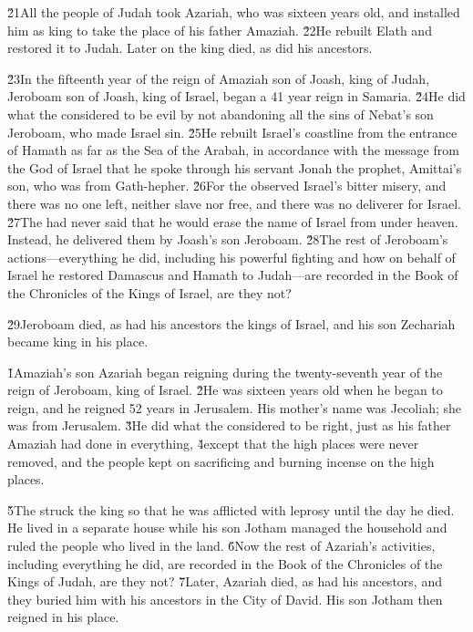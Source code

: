 \v{21}All the people of Judah took Azariah, who was sixteen years old, and installed him as king to take the place of his father Amaziah. \v{22}He rebuilt Elath and restored it to Judah. Later on the king died, as did his ancestors.

\v{23}In the fifteenth year of the reign of Amaziah son of Joash, king of Judah, Jeroboam son of Joash, king of Israel, began a 41 year reign in Samaria. \v{24}He did what the  considered to be evil by not abandoning all the sins of Nebat's son Jeroboam, who made Israel sin. \v{25}He rebuilt Israel's coastline from the entrance of Hamath as far as the Sea of the Arabah, in accordance with the message from the  God of Israel that he spoke through his servant Jonah the prophet, Amittai's son, who was from Gath-hepher. \v{26}For the  observed Israel's bitter misery, and there was no one left, neither slave nor free, and there was no deliverer for Israel. \v{27}The  had never said that he would erase the name of Israel from under heaven. Instead, he delivered them by Joash's son Jeroboam. \v{28}The rest of Jeroboam's actions---everything he did, including his powerful fighting and how on behalf of Israel he restored Damascus and Hamath to Judah---are recorded in the Book of the Chronicles of the Kings of Israel, are they not?

\v{29}Jeroboam died, as had his ancestors the kings of Israel, and his son Zechariah became king in his place.

\v{1}Amaziah's son Azariah began reigning during the twenty-seventh year of the reign of Jeroboam, king of Israel. \v{2}He was sixteen years old when he began to reign, and he reigned 52 years in Jerusalem. His mother's name was Jecoliah; she was from Jerusalem. \v{3}He did what the  considered to be right, just as his father Amaziah had done in everything, \v{4}except that the high places were never removed, and the people kept on sacrificing and burning incense on the high places.

\v{5}The  struck the king so that he was afflicted with leprosy until the day he died. He lived in a separate house while his son Jotham managed the household and ruled the people who lived in the land. \v{6}Now the rest of Azariah's activities, including everything he did, are recorded in the Book of the Chronicles of the Kings of Judah, are they not? \v{7}Later, Azariah died, as had his ancestors, and they buried him with his ancestors in the City of David. His son Jotham then reigned in his place.

